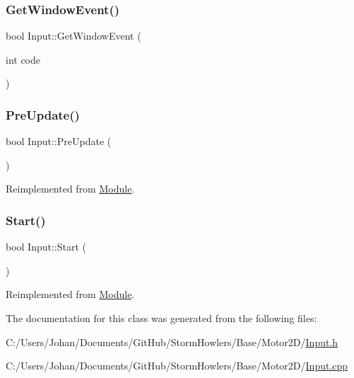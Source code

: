 \subsubsection{\texorpdfstring{GetWindowEvent()}{GetWindowEvent()}\hspace{0.1cm}{\footnotesize\ttfamily [2/2]}}
{\footnotesize\ttfamily bool Input\+::\+Get\+Window\+Event (\begin{DoxyParamCaption}\item[{int}]{code }\end{DoxyParamCaption})}

\mbox{\label{class_input_a850eff60334f4057e5cb579892d7cf06}} 
\subsubsection{\texorpdfstring{PreUpdate()}{PreUpdate()}}
{\footnotesize\ttfamily bool Input\+::\+Pre\+Update (\begin{DoxyParamCaption}{ }\end{DoxyParamCaption})\hspace{0.3cm}{\ttfamily [virtual]}}



Reimplemented from \mbox{\hyperlink{class_module_a2c64af5917825500cf6f0497258bc398}{Module}}.

\mbox{\label{class_input_a8519ba5884a6ea0d3ef332788ee248a8}} 
\subsubsection{\texorpdfstring{Start()}{Start()}}
{\footnotesize\ttfamily bool Input\+::\+Start (\begin{DoxyParamCaption}{ }\end{DoxyParamCaption})\hspace{0.3cm}{\ttfamily [virtual]}}



Reimplemented from \mbox{\hyperlink{class_module_aaf67046743296e8de310039a1dc95d86}{Module}}.



The documentation for this class was generated from the following files\+:\begin{DoxyCompactItemize}
\item 
C\+:/\+Users/\+Johan/\+Documents/\+Git\+Hub/\+Storm\+Howlers/\+Base/\+Motor2\+D/\mbox{\hyperlink{_input_8h}{Input.\+h}}\item 
C\+:/\+Users/\+Johan/\+Documents/\+Git\+Hub/\+Storm\+Howlers/\+Base/\+Motor2\+D/\mbox{\hyperlink{_input_8cpp}{Input.\+cpp}}\end{DoxyCompactItemize}
